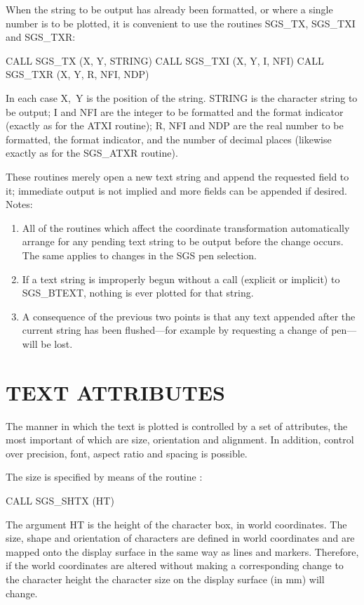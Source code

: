 \documentclass[11pt]{starlink}
\begin{document}
When the string to be output has already been formatted, or where
a single number is to be plotted, it is convenient to use the
routines SGS\_TX, SGS\_TXI and SGS\_TXR:
\begin{terminalv}
CALL SGS_TX (X, Y, STRING)
CALL SGS_TXI (X, Y, I, NFI)
CALL SGS_TXR (X, Y, R, NFI, NDP)
\end{terminalv}
In each case X,~Y is the position of the string.  STRING is the
character string to be output;  I and NFI are the integer to be
formatted and the format indicator (exactly as for the ATXI
routine);  R, NFI and NDP are the real number to be formatted,
the format indicator, and the number of decimal places (likewise
exactly as for the SGS\_ATXR routine).

These routines merely open a new text string and append the
requested field to it;  immediate
output is not implied and more fields can be appended if
desired.
\goodbreak
Notes:
\begin{enumerate}
\item All of the routines which affect the coordinate transformation
automatically arrange for any pending text string to
be output before the change occurs.  The same applies to
changes in the SGS pen selection.
\item If a text string is improperly begun without a call (explicit
or implicit) to SGS\_BTEXT, nothing is ever plotted for
that string.
\item A consequence of the previous two points is that any text
appended after the current string has been flushed---for
example by requesting a change of pen---will
be lost.
\end{enumerate}

\section {TEXT ATTRIBUTES}

The manner in which the text is plotted is controlled by a set
of attributes, the most important of which
are size, orientation and alignment.  In addition,
control over precision, font, aspect ratio and spacing is
possible.

The size is specified by means of the routine :
\begin{terminalv}
CALL SGS_SHTX (HT)
\end{terminalv}
The argument HT is the height of the character box, in world
coordinates.  The size, shape and orientation of characters are defined
in world coordinates and are mapped onto the display surface in
the same way as lines and markers.  Therefore,
if the world coordinates are altered
without making a corresponding change to the character height the character
size on the display surface (in mm) will change.
\end{document}
